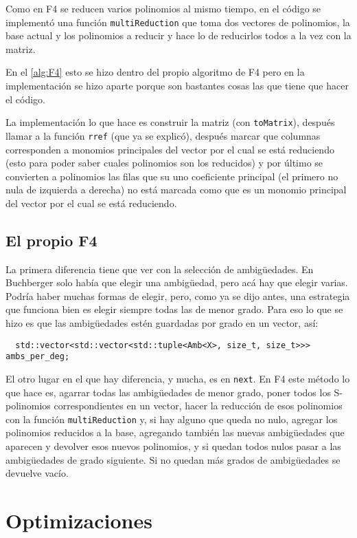 \documentclass[12pt]{report}
\theoremstyle{customstyle}
\theoremstyle{factstyle}
\begin{document}
Como en F4 se reducen varios polinomios al mismo tiempo, en el código se implementó una función \texttt{multiReduction} que toma dos vectores de polinomios, la base actual y los polinomios a reducir y hace lo de reducirlos todos a la vez con la matriz.

En el \cref{alg:F4} esto se hizo dentro del propio algoritmo de F4 pero en la implementación se hizo aparte porque son bastantes cosas las que tiene que hacer el código.

La implementación lo que hace es construir la matriz (con \texttt{toMatrix}), después llamar a la función \texttt{rref} (que ya se explicó), después marcar que columnas corresponden a monomios principales del vector por el cual se está reduciendo (esto para poder saber cuales polinomios son los reducidos) y por último se convierten a polinomios las filas que su uno coeficiente principal (el primero no nula de izquierda a derecha) no está marcada como que es un monomio principal del vector por el cual se está reduciendo.

\subsection{El propio F4}

La primera diferencia tiene que ver con la selección de ambigüedades. En Buchberger solo había que elegir una ambigüedad, pero acá hay que elegir varias. Podría haber muchas formas de elegir, pero, como ya se dijo antes, una estrategia que funciona bien es elegir siempre todas las de menor grado. Para eso lo que se hizo es que las ambigüedades estén guardadas por grado en un vector, así:

\begin{verbatim}
  std::vector<std::vector<std::tuple<Amb<X>, size_t, size_t>>> ambs_per_deg;
\end{verbatim}

El otro lugar en el que hay diferencia, y mucha, es en \texttt{next}. En F4 este método lo que hace es, agarrar todas las ambigüedades de menor grado, poner todos los S-polinomios correspondientes en un vector, hacer la reducción de esos polinomios con la función \texttt{multiReduction} y, si hay alguno que queda no nulo, agregar los polinomios reducidos a la base, agregando también las nuevas ambigüedades que aparecen y devolver esos nuevos polinomios, y si quedan todos nulos pasar a las ambigüedades de grado siguiente. Si no quedan más grados de ambigüedades se devuelve vacío.

\section{Optimizaciones}\label{secton:optimizaciones}
\end{document}

